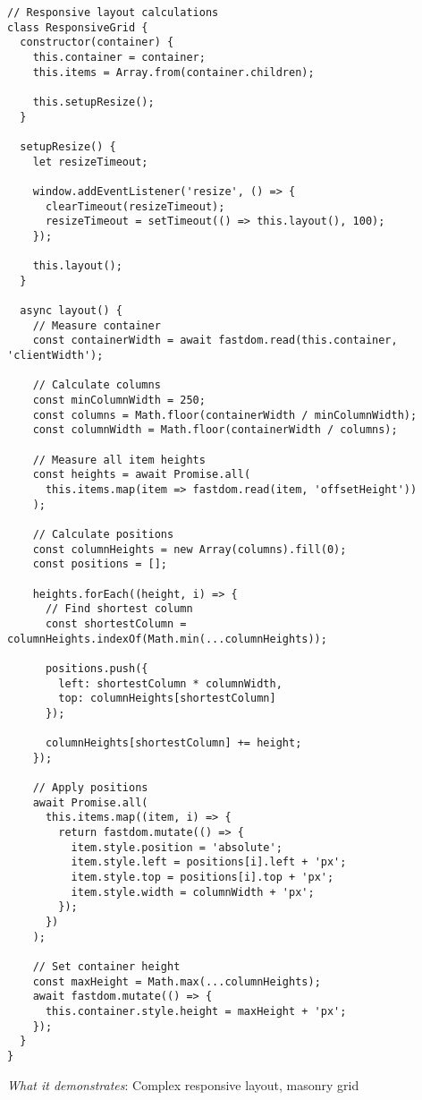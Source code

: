 \documentclass[11pt]{article}
\begin{document}
\begin{verbatim}
// Responsive layout calculations
class ResponsiveGrid {
  constructor(container) {
    this.container = container;
    this.items = Array.from(container.children);
    
    this.setupResize();
  }
  
  setupResize() {
    let resizeTimeout;
    
    window.addEventListener('resize', () => {
      clearTimeout(resizeTimeout);
      resizeTimeout = setTimeout(() => this.layout(), 100);
    });
    
    this.layout();
  }
  
  async layout() {
    // Measure container
    const containerWidth = await fastdom.read(this.container, 'clientWidth');
    
    // Calculate columns
    const minColumnWidth = 250;
    const columns = Math.floor(containerWidth / minColumnWidth);
    const columnWidth = Math.floor(containerWidth / columns);
    
    // Measure all item heights
    const heights = await Promise.all(
      this.items.map(item => fastdom.read(item, 'offsetHeight'))
    );
    
    // Calculate positions
    const columnHeights = new Array(columns).fill(0);
    const positions = [];
    
    heights.forEach((height, i) => {
      // Find shortest column
      const shortestColumn = columnHeights.indexOf(Math.min(...columnHeights));
      
      positions.push({
        left: shortestColumn * columnWidth,
        top: columnHeights[shortestColumn]
      });
      
      columnHeights[shortestColumn] += height;
    });
    
    // Apply positions
    await Promise.all(
      this.items.map((item, i) => {
        return fastdom.mutate(() => {
          item.style.position = 'absolute';
          item.style.left = positions[i].left + 'px';
          item.style.top = positions[i].top + 'px';
          item.style.width = columnWidth + 'px';
        });
      })
    );
    
    // Set container height
    const maxHeight = Math.max(...columnHeights);
    await fastdom.mutate(() => {
      this.container.style.height = maxHeight + 'px';
    });
  }
}
\end{verbatim}

\emph{What it demonstrates}: Complex responsive layout, masonry grid
\end{document}
